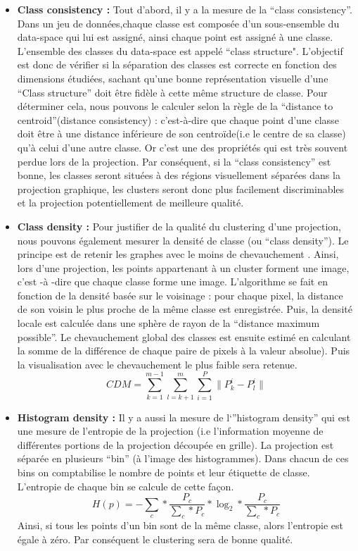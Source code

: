 \begin{itemize}
\item
\textbf{Class consistency : }
\smallskip
Tout d'abord, il y a la mesure de la “class consistency”\cite{bertini2011Class-Consistency}.
 Dans un jeu de données,chaque classe est composée d’un sous-ensemble du data-space qui lui est assigné, ainsi
chaque point est assigné à une classe. L’ensemble des classes du data-space est appelé
“class structure".
L'objectif est donc de vérifier si la séparation des classes est correcte en fonction des
dimensions étudiées, sachant qu’une bonne représentation visuelle d’une “Class structure”
doit être fidèle à cette même structure de classe. Pour déterminer cela, nous pouvons le
calculer selon la règle de la “distance to centroid”(distance consistency) : c’est-à-dire que
chaque point d’une classe doit être à une distance inférieure de son centroïde(i.e le centre de sa
classe) qu’à celui d’une autre classe.
Or c’est une des propriétés qui est très souvent perdue lors de la projection.
Par conséquent, si la “class consistency” est bonne, les classes seront situées à des régions
visuellement séparées dans la projection graphique, les clusters seront donc plus
facilement discriminables et la projection potentiellement de meilleure qualité.

\item
\textbf{Class density : }
\smallskip
 Pour justifier de la qualité du clustering d’une projection, nous pouvons également
mesurer la densité de classe (ou “class density”).
Le principe est de retenir les graphes avec le moins de chevauchement \cite{AndradaTatu2010visual}.
Ainsi, lors d’une projection, les points appartenant à un cluster forment une image, c'est -à
-dire que chaque classe forme une image.
L’algorithme se fait en fonction de la densité basée sur le voisinage : pour chaque pixel, la
distance de son voisin le plus proche de la même classe est enregistrée. Puis, la densité
locale est calculée dans une sphère de rayon de la “distance maximum possible”.
Le chevauchement global des classes est ensuite estimé en calculant la somme de la
différence de chaque paire de pixels à la valeur absolue). Puis la visualisation avec le
chevauchement le plus faible sera retenue.
\[CDM =  \sum_{k=1}^{m-1} \sum_{l=k+1}^{m} \sum_{i=1}^{P} \lVert P_{k}^{i} - P_{l}^{i} \rVert \]


\item
\textbf{Histogram density : }
\smallskip
Il y a aussi la mesure de l`”histogram density” \cite{HeulotThese} \cite{AndradaTatu2009combining} qui est une mesure de l’entropie de la projection
(i.e l'information moyenne de différentes portions de la projection découpée en grille). La
projection est séparée en plusieurs “bin” (à l'image des histogrammes). Dans chacun de
ces bins on comptabilise le nombre de points et leur étiquette de classe. L’entropie de
chaque bin se calcule de cette façon. \[ H(p) = - \sum_{c} * \frac{P_c}{\sum_{c}*P_c} * \log_2 * \frac{P_c}{\sum_c * P_c} \]
Ainsi, si tous les points d’un bin sont de la même classe, alors l’entropie est égale à zéro. Par conséquent le clustering sera de bonne qualité.

\end{itemize}
\smallskip

